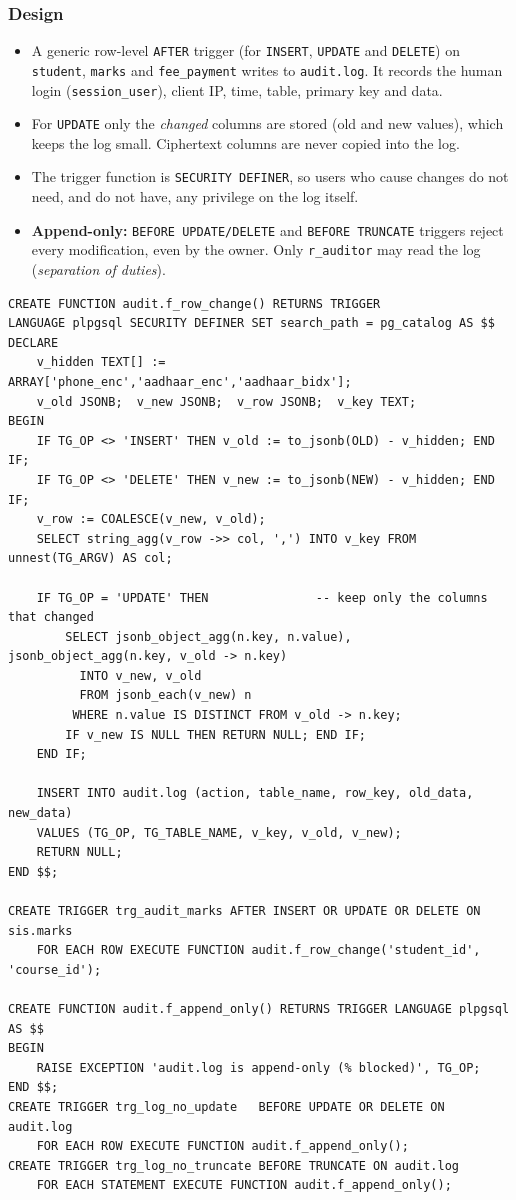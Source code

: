 \documentclass[11pt,a4paper]{report}
\begin{document}
\subsubsection{Design}
\begin{itemize}
    \item A generic row-level \texttt{AFTER} trigger (for \texttt{INSERT}, \texttt{UPDATE} and \texttt{DELETE}) on \texttt{student}, \texttt{marks} and \texttt{fee\_payment} writes to \texttt{audit.log}. It records the human login (\texttt{session\_user}), client IP, time, table, primary key and data.
    \item For \texttt{UPDATE} only the \emph{changed} columns are stored (old and new values), which keeps the log small. Ciphertext columns are never copied into the log.
    \item The trigger function is \texttt{SECURITY DEFINER}, so users who cause changes do not need, and do not have, any privilege on the log itself.
    \item \textbf{Append-only:} \texttt{BEFORE UPDATE/DELETE} and \texttt{BEFORE TRUNCATE} triggers reject every modification, even by the owner. Only \texttt{r\_auditor} may read the log (\emph{separation of duties}).
\end{itemize}

\begin{lstlisting}[caption={Generic change-capture trigger and append-only protection}]
CREATE FUNCTION audit.f_row_change() RETURNS TRIGGER
LANGUAGE plpgsql SECURITY DEFINER SET search_path = pg_catalog AS $$
DECLARE
    v_hidden TEXT[] := ARRAY['phone_enc','aadhaar_enc','aadhaar_bidx'];
    v_old JSONB;  v_new JSONB;  v_row JSONB;  v_key TEXT;
BEGIN
    IF TG_OP <> 'INSERT' THEN v_old := to_jsonb(OLD) - v_hidden; END IF;
    IF TG_OP <> 'DELETE' THEN v_new := to_jsonb(NEW) - v_hidden; END IF;
    v_row := COALESCE(v_new, v_old);
    SELECT string_agg(v_row ->> col, ',') INTO v_key FROM unnest(TG_ARGV) AS col;

    IF TG_OP = 'UPDATE' THEN               -- keep only the columns that changed
        SELECT jsonb_object_agg(n.key, n.value), jsonb_object_agg(n.key, v_old -> n.key)
          INTO v_new, v_old
          FROM jsonb_each(v_new) n
         WHERE n.value IS DISTINCT FROM v_old -> n.key;
        IF v_new IS NULL THEN RETURN NULL; END IF;
    END IF;

    INSERT INTO audit.log (action, table_name, row_key, old_data, new_data)
    VALUES (TG_OP, TG_TABLE_NAME, v_key, v_old, v_new);
    RETURN NULL;
END $$;

CREATE TRIGGER trg_audit_marks AFTER INSERT OR UPDATE OR DELETE ON sis.marks
    FOR EACH ROW EXECUTE FUNCTION audit.f_row_change('student_id', 'course_id');

CREATE FUNCTION audit.f_append_only() RETURNS TRIGGER LANGUAGE plpgsql AS $$
BEGIN
    RAISE EXCEPTION 'audit.log is append-only (% blocked)', TG_OP;
END $$;
CREATE TRIGGER trg_log_no_update   BEFORE UPDATE OR DELETE ON audit.log
    FOR EACH ROW EXECUTE FUNCTION audit.f_append_only();
CREATE TRIGGER trg_log_no_truncate BEFORE TRUNCATE ON audit.log
    FOR EACH STATEMENT EXECUTE FUNCTION audit.f_append_only();
\end{lstlisting}
\end{document}
